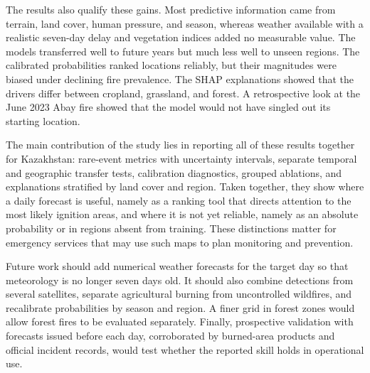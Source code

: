 \documentclass[pdflatex,sn-mathphys-num]{sn-jnl}
\begin{document}
The results also qualify these gains. Most predictive information came from terrain, land cover, human pressure, and season, whereas weather available with a realistic seven-day delay and vegetation indices added no measurable value. The models transferred well to future years but much less well to unseen regions. The calibrated probabilities ranked locations reliably, but their magnitudes were biased under declining fire prevalence. The SHAP explanations showed that the drivers differ between cropland, grassland, and forest. A retrospective look at the June 2023 Abay fire showed that the model would not have singled out its starting location.

The main contribution of the study lies in reporting all of these results together for Kazakhstan: rare-event metrics with uncertainty intervals, separate temporal and geographic transfer tests, calibration diagnostics, grouped ablations, and explanations stratified by land cover and region. Taken together, they show where a daily forecast is useful, namely as a ranking tool that directs attention to the most likely ignition areas, and where it is not yet reliable, namely as an absolute probability or in regions absent from training. These distinctions matter for emergency services that may use such maps to plan monitoring and prevention.

Future work should add numerical weather forecasts for the target day so that meteorology is no longer seven days old. It should also combine detections from several satellites, separate agricultural burning from uncontrolled wildfires, and recalibrate probabilities by season and region. A finer grid in forest zones would allow forest fires to be evaluated separately. Finally, prospective validation with forecasts issued before each day, corroborated by burned-area products and official incident records, would test whether the reported skill holds in operational use.


\end{document}
